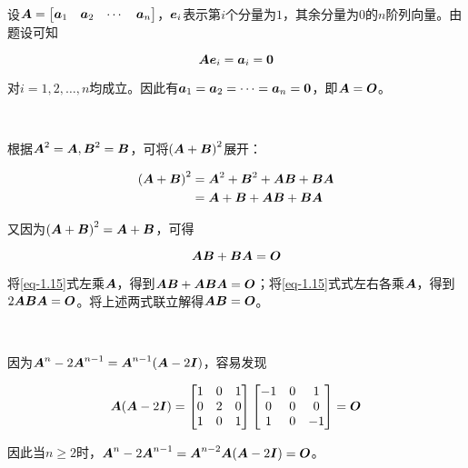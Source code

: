 \documentclass{ctexart}
\begin{document}
\begin{problem}\

设\(\mata=\begin{bmatrix}\veca_1&\veca_2&\cdots&\veca_n\end{bmatrix}\)，\(\vece_i\)表示第\(i\)个分量为\(1\)，其余分量为\(0\)的\(n\)阶列向量。由题设可知

\begin{equation*}
    \mata\vece_i=\veca_i=\veczero
\end{equation*}

对\(i=1,2,\dots,n\)均成立。因此有\(\veca_1=\veca_2=\cdots=\veca_n=\veczero\)，即\(\mata=\mato\)。

\end{problem}

\begin{problem}\

根据\(\mata^2=\mata,\matb^2=\matb\)，可将\(\mypar{\mata+\matb}^2\)展开：

\begin{align*}
    \mypar{\mata+\matb}^2 & =\mata^2+\matb^2+\mata\matb+\matb\mata \\
                          & =\mata+\matb+\mata\matb+\matb\mata
\end{align*}

又因为\(\mypar{\mata+\matb}^2=\mata+\matb\)，可得

\begin{equation}\label{eq-1.15}
    \mata\matb+\matb\mata=\mato
\end{equation}

将\eqref{eq-1.15}式左乘\(\mata\)，得到\(\mata\matb+\mata\matb\mata=\mato\)；将\eqref{eq-1.15}式式左右各乘\(\mata\)，得到\(2\mata\matb\mata=\mato\)。将上述两式联立解得\(\mata\matb=\mato\)。

\end{problem}

\begin{problem}\

因为\(\mata^n-2\mata^{n-1}=\mata^{n-1}(\mata-2\mati)\)，容易发现

\begin{equation*}
    \mata(\mata-2\mati)=
    \begin{bmatrix}
        1 & 0 & 1 \\0&2&0\\1&0&1
    \end{bmatrix}
    \begin{bmatrix}
        -1 & 0 & 1 \\0&0&0\\1&0&-1
    \end{bmatrix}=\mato
\end{equation*}

因此当\(n\ge2\)时，\(\mata^n-2\mata^{n-1}=\mata^{n-2}\mata(\mata-2\mati)=\mato\)。

\end{problem}
\end{document}
